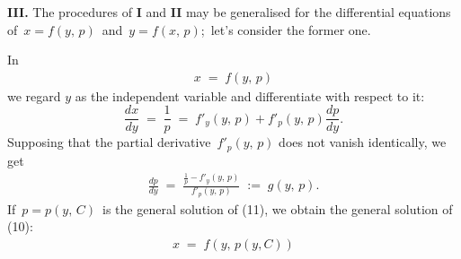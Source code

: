\documentclass[12pt]{article}
\theoremstyle{definition}
\begin{document}
\textbf{III.}\; The procedures of \textbf{I} and \textbf{II} may be generalised for the differential equations of 
 \,$x = f(y,\,p)$\, and\, $y = f(x,\,p)$;\, let's consider the former one.

In
\begin{align}
x \;=\; f(y,\,p)
\end{align}
we regard $y$ as the independent variable and differentiate with respect to it:
$$\frac{dx}{dy} \;=\; \frac{1}{p} \;=\; f'_y(y,\,p)\!+\!f'_p(y,\,p)\frac{dp}{dy}.$$
Supposing that the partial derivative \,$f'_p(y,\,p)$ does not vanish identically, we get
\begin{align}
 \frac{dp}{dy} \;=\; \frac{\frac{1}{p}-f'_y(y,\,p)}{f'_p(y,\,p)} \;:=\; g(y,\,p).
\end{align}
If\, $p = p(y,\,C)$\, is the general solution of (11), we obtain the general solution of (10):
\begin{align}
x \;=\; f(y,\,p(y,C))
\end{align}


\end{document}
